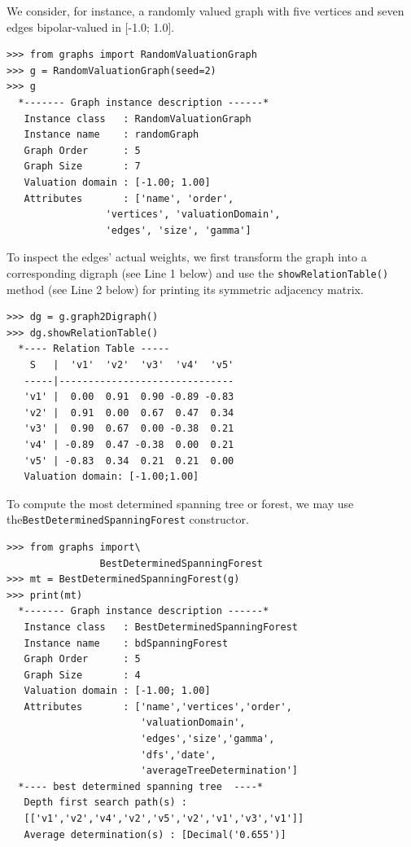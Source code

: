 We consider, for instance, a randomly valued graph with five vertices and seven edges bipolar-valued in [-1.0; 1.0]. 
\begin{lstlisting}
>>> from graphs import RandomValuationGraph
>>> g = RandomValuationGraph(seed=2)
>>> g
  *------- Graph instance description ------*
   Instance class   : RandomValuationGraph
   Instance name    : randomGraph
   Graph Order      : 5
   Graph Size       : 7
   Valuation domain : [-1.00; 1.00]
   Attributes       : ['name', 'order',
                 'vertices', 'valuationDomain',
                 'edges', 'size', 'gamma']
\end{lstlisting}
To inspect the edges' actual weights, we first transform the graph into a corresponding digraph (see Line 1 below) and use the \texttt{showRelationTable()} method (see Line 2 below) for printing its symmetric adjacency matrix. 
\begin{lstlisting}[caption={Symmetric relation table},label=list:23.1]
>>> dg = g.graph2Digraph()
>>> dg.showRelationTable()
  *---- Relation Table -----
    S   |  'v1'	 'v2'  'v3'  'v4'  'v5'	  
   -----|------------------------------
   'v1' |  0.00	 0.91  0.90 -0.89 -0.83	 
   'v2' |  0.91	 0.00  0.67  0.47  0.34	 
   'v3' |  0.90	 0.67  0.00 -0.38  0.21	 
   'v4' | -0.89	 0.47 -0.38  0.00  0.21	 
   'v5' | -0.83	 0.34  0.21  0.21  0.00	 
   Valuation domain: [-1.00;1.00]
\end{lstlisting}

To compute the most determined spanning tree or forest, we may use the\texttt{BestDeterminedSpanningForest} constructor.
\begin{lstlisting}
>>> from graphs import\
                BestDeterminedSpanningForest
>>> mt = BestDeterminedSpanningForest(g)
>>> print(mt)
  *------- Graph instance description ------*
   Instance class   : BestDeterminedSpanningForest
   Instance name    : bdSpanningForest
   Graph Order      : 5
   Graph Size       : 4
   Valuation domain : [-1.00; 1.00]
   Attributes       : ['name','vertices','order',
                       'valuationDomain',
                       'edges','size','gamma',
                       'dfs','date',
                       'averageTreeDetermination']
  *---- best determined spanning tree  ----*
   Depth first search path(s) :
   [['v1','v2','v4','v2','v5','v2','v1','v3','v1']]
   Average determination(s) : [Decimal('0.655')]
\end{lstlisting}

